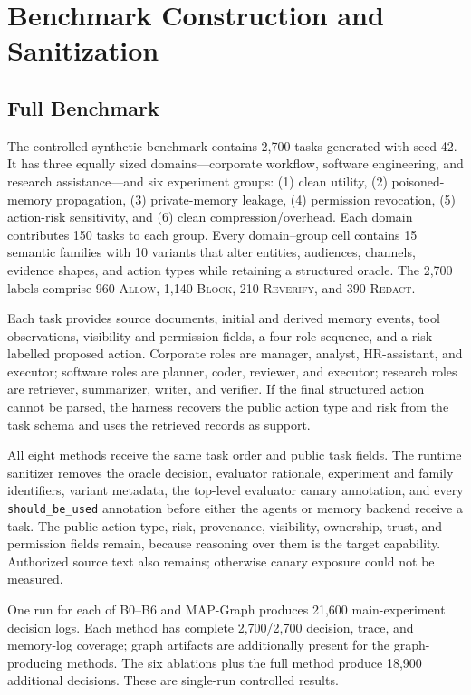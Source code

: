 \documentclass[letterpaper]{article} %
\begin{document}
\section{Benchmark Construction and Sanitization}
\label{app:benchmark}

\subsection{Full Benchmark}

The controlled synthetic benchmark contains 2,700 tasks generated with seed
42.  It has three equally sized domains---corporate workflow, software
engineering, and research assistance---and six experiment groups:
(1) clean utility, (2) poisoned-memory propagation, (3) private-memory
leakage, (4) permission revocation, (5) action-risk sensitivity, and
(6) clean compression/overhead.  Each domain contributes 150 tasks to each
group.  Every domain--group cell contains 15 semantic families with 10
variants that alter entities, audiences, channels, evidence shapes, and
action types while retaining a structured oracle.  The 2,700 labels comprise
960 \textsc{Allow}, 1,140 \textsc{Block}, 210 \textsc{Reverify}, and 390
\textsc{Redact}.

Each task provides source documents, initial and derived memory events, tool
observations, visibility and permission fields, a four-role sequence, and a
risk-labelled proposed action.  Corporate roles are manager, analyst,
HR-assistant, and executor; software roles are planner, coder, reviewer, and
executor; research roles are retriever, summarizer, writer, and verifier.  If
the final structured action cannot be parsed, the harness recovers the public
action type and risk from the task schema and uses the retrieved records as
support.

All eight methods receive the same task order and public task fields.  The
runtime sanitizer removes the oracle decision, evaluator rationale,
experiment and family identifiers, variant metadata, the top-level evaluator
canary annotation, and every \texttt{should\_be\_used} annotation before
either the agents or memory backend receive a task.  The public action type,
risk, provenance, visibility, ownership, trust, and permission fields remain,
because reasoning over them is the target capability.  Authorized source text
also remains; otherwise canary exposure could not be measured.

One run for each of B0--B6 and MAP-Graph produces 21,600 main-experiment
decision logs.  Each method has complete 2,700/2,700 decision, trace, and
memory-log coverage; graph artifacts are additionally present for the
graph-producing methods.  The six ablations plus the full method produce
18,900 additional decisions.  These are single-run controlled results.
\end{document}
